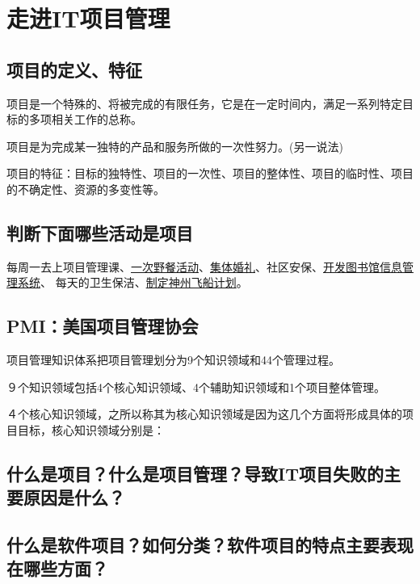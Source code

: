 \chapter{走进IT项目管理}
\section{项目的定义、特征}
项目是一个特殊的、将被完成的有限任务，它是在一定时间内，满足一系列特定目标的多项相关工作的总称。
\par 项目是为完成某一独特的产品和服务所做的一次性努力。(另一说法)
\par 项目的特征：目标的独特性、项目的一次性、项目的整体性、项目的临时性、项目的不确定性、资源的多变性等。
\section{判断下面哪些活动是项目}
每周一去上项目管理课、\underline{一次野餐活动}、\underline{集体婚礼}、社区安保、\underline{开发图书馆信息管理系统}、 每天的卫生保洁、\underline{制定神州飞船计划}。
\section{PMI：美国项目管理协会}
项目管理知识体系把项目管理划分为9个知识领域和44个管理过程。
\par ９个知识领域包括4个核心知识领域、4个辅助知识领域和1个项目整体管理。
\par ４个核心知识领域，之所以称其为核心知识领域是因为这几个方面将形成具体的项目目标，核心知识领域分别是：
\par 
\section{什么是项目？什么是项目管理？导致IT项目失败的主要原因是什么？}
\section{什么是软件项目？如何分类？软件项目的特点主要表现在哪些方面？}
